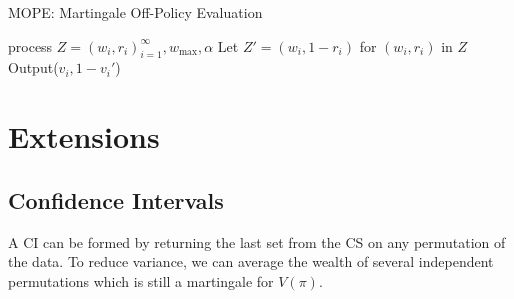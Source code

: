 \begin{algorithm}[tb]
   \caption{MOPE: Martingale Off-Policy Evaluation}
   \label{alg:main}
\begin{algorithmic}
     process $Z=(w_i,r_i)_{i=1}^\infty, w_{\max}, \alpha$
    \STATE Let $Z' = (w_i,1-r_i)$ for $(w_i,r_i)$ in $Z$
        \STATE Output($v_i,1-v_i'$)
   \ENDFOR
{}
\ENDFUNCTION
\end{algorithmic}
\end{algorithm}

\section{Extensions}

\subsection{Confidence Intervals}
A CI can be formed by returning the last set from the CS on any permutation of
the data.  To reduce variance, we can average the wealth of several independent
permutations which is still a martingale for $V(\pi)$.

